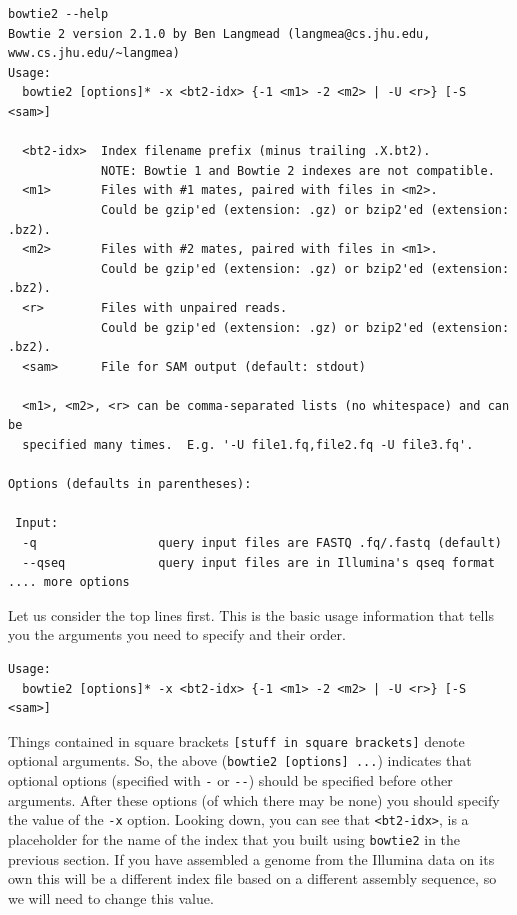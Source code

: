 \documentclass[11pt]{article}
\begin{document}
\begin{verbatim}
bowtie2 --help
Bowtie 2 version 2.1.0 by Ben Langmead (langmea@cs.jhu.edu, www.cs.jhu.edu/~langmea)
Usage: 
  bowtie2 [options]* -x <bt2-idx> {-1 <m1> -2 <m2> | -U <r>} [-S <sam>]

  <bt2-idx>  Index filename prefix (minus trailing .X.bt2).
             NOTE: Bowtie 1 and Bowtie 2 indexes are not compatible.
  <m1>       Files with #1 mates, paired with files in <m2>.
             Could be gzip'ed (extension: .gz) or bzip2'ed (extension: .bz2).
  <m2>       Files with #2 mates, paired with files in <m1>.
             Could be gzip'ed (extension: .gz) or bzip2'ed (extension: .bz2).
  <r>        Files with unpaired reads.
             Could be gzip'ed (extension: .gz) or bzip2'ed (extension: .bz2).
  <sam>      File for SAM output (default: stdout)

  <m1>, <m2>, <r> can be comma-separated lists (no whitespace) and can be
  specified many times.  E.g. '-U file1.fq,file2.fq -U file3.fq'.

Options (defaults in parentheses):

 Input:
  -q                 query input files are FASTQ .fq/.fastq (default)
  --qseq             query input files are in Illumina's qseq format
.... more options
\end{verbatim}


Let us consider the top lines first. This is the basic usage information
that tells you the arguments you need to specify and their order.

\begin{verbatim}
Usage: 
  bowtie2 [options]* -x <bt2-idx> {-1 <m1> -2 <m2> | -U <r>} [-S <sam>]
\end{verbatim}

Things contained in square brackets \texttt{[stuff in square brackets]} denote
optional arguments. So, the above (\texttt{bowtie2 [options] ...}) indicates that optional options (specified
with \texttt{-} or \texttt{-{}-}) should be specified before other arguments. After these
options (of which there may be none) you should specify the value of the \texttt{-x}
option. Looking down, you can see that \texttt{<bt2-idx>}, is a placeholder for
the name of the index that you built using \texttt{bowtie2} in the
previous section. If you have assembled a genome from the Illumina data on
its own this will be a different index file based on a different assembly
sequence, so we will need to change this value.
\end{document}
